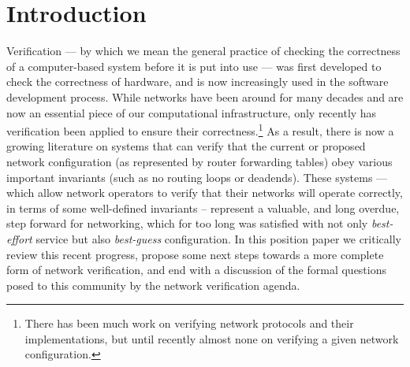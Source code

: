 \section{Introduction}
\label{sec:introduction}

Verification --- by which we mean the general practice of checking the correctness of a computer-based system before it is put into use --- was first developed to
check the correctness of hardware, and is now increasingly used in the software development process. While networks have been around for many decades and are now an essential piece of our computational infrastructure, only recently has verification been applied to ensure their correctness.\footnote{There has been much work on verifying network protocols and their implementations, but until recently almost none on verifying a given network configuration.} As a result, there is now a growing literature on systems that can verify that the current or proposed network configuration (as represented by router forwarding tables) obey various important invariants (such as no routing loops or deadends).
These systems --- which allow network operators to verify that their networks will operate correctly, in terms of some well-defined invariants -- represent a valuable, and long overdue, step forward for networking, which for too long was satisfied with not only {\em best-effort} service but also {\em best-guess} configuration. In this position paper we critically review this recent progress, propose some next steps towards a more complete form of network verification, and end with a discussion of the formal questions posed to this community by the network verification agenda.

